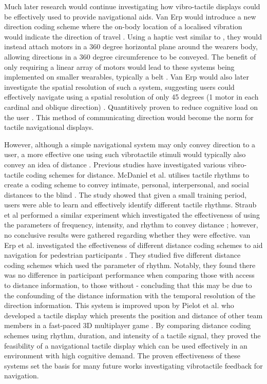 \documentclass{interim}
\begin{document}
Much later research would continue investigating how vibro-tactile displays could be effectively used to provide navigational aids. Van Erp would introduce a new direction coding scheme where the on-body location of a localised vibration would indicate the direction of travel \cite{van2000tactile}. Using a haptic vest similar to \cite{729547}, they would instead attach motors in a 360 degree horizontal plane around the wearers body, allowing directions in a 360 degree circumference to be conveyed. The benefit of only requiring a linear array of motors would lead to these systems being implemented on smaller wearables, typically a belt \cite{10.1145/1463160.1463179, tsukada2004activebelt, 10.1145/2449396.2449450}. Van Erp would also later investigate the spatial resolution of such a system, suggesting users could effectively navigate using a spatial resolution of only 45 degrees (1 motor in each cardinal and oblique direction) \cite{10.1145/1060581.1060585}. Quantitively proven to reduce cognitive load on the user \cite{VANERP2004247}. This method of communicating direction would become the norm for tactile navigational displays.

However, although a simple navigational system may only convey direction to a user, a more effective one using such vibrotactile stimuli would typically also convey an idea of distance \cite{burntt2002empirical}. Previous studies have investigated various vibro-tactile coding schemes for distance. McDaniel et al. utilises tactile rhythms to create a coding scheme to convey intimate, personal, interpersonal, and social distances to the blind \cite{10.1145/1520340.1520718}. The study showed that given a small training period, users were able to learn and effectively identify different tactile rhythms. Straub et al performed a similar experiment which investigated the effectiveness of using the parameters of frequency, intensity, and rhythm to convey distance \cite{5326374}; however, no conclusive results were gathered regarding whether they were effective. van Erp et al. investigated the effectiveness of different distance coding schemes to aid navigation for pedestrian participants \cite{10.1145/1060581.1060585}. They studied five different distance coding schemes which used the parameter of rhythm. Notably, they found there was no difference in participant performance when comparing those with access to distance information, to those without - concluding that this may be due to the confounding of the distance information with the temporal resolution of the direction information. This system is improved upon by Pielot et al. who developed a tactile display which presents the position and distance of other team members in a fast-paced 3D multiplayer game \cite{10.1145/1753326.1753581}. By comparing distance coding schemes using rhythm, duration, and intensity of a tactile signal, they proved the feasibility of a navigational tactile display which can be used effectively in an environment with high cognitive demand. The proven effectiveness of these systems set the basis for many future works investigating vibrotactile feedback for navigation.
\end{document}

